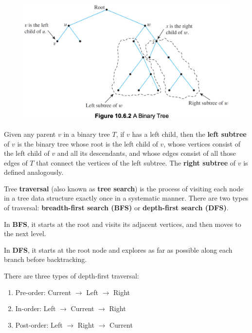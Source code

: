 \documentclass{article}
\begin{document}
\begin{description}
    \begin{figure}[H]
    	\centering
		\includegraphics[scale=0.4]{btree}
    \end{figure}
    
    \item[Left Subtree / Right Subtree]Given any parent $v$ in a binary tree $T$, if $v$ has a left child, then the \textbf{left subtree} of $v$ is the binary tree whose root is the left child of $v$, whose vertices consist of the left child of $v$ and all its descendants, and whose edges consist of all those edges of $T$ that connect the vertices of the left subtree. The \textbf{right subtree} of $v$ is defined analogously.
    \item[Binary Tree Traversal] Tree \textbf{traversal} (also known as \textbf{tree search}) is the process of visiting each node in a tree data structure exactly once in a systematic manner. There are two types of traversal: \textbf{breadth-first search (BFS)} or \textbf{depth-first search (DFS)}. 
    \item \qquad In \textbf{BFS}, it starts at the root and visits its adjacent vertices, and then moves to the next level. 
    \item \qquad In \textbf{DFS}, it starts at the root node and explores as far as possible along each branch before backtracking. 
    \item \qquad There are three types of depth-first traversal: 
	\begin{enumerate}
		\item Pre-order: Current $\to$ Left $\to$ Right
		\item In-order: Left $\to$ Current $\to$ Right 
		\item Post-order: Left $\to$ Right $\to$ Current
	\end{enumerate}
	

\end{description}
\end{document}
